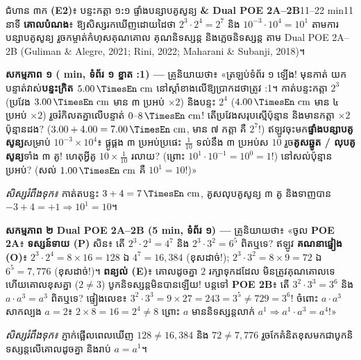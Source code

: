 \documentclass[a4paper,12pt]{article}
\newcommand{\en}[1]{{\TimesEn #1}}
\newcommand{\enbf}[1]{{\TimesEn\textbf{#1}}}
\newcommand{\unit}[1]{\,\text{\en{#1}}}
\newcommand{\scriptlead}{{\normalfont\mdseries\muol\fontsize{10.8pt}{17pt}\selectfont គ្រូនិយាយថា៖}}
\begin{document}
\Needspace{2.0cm}
\begin{phasebox}{ជំហាន ៣ក \enbf{(E2)}៖ បន្ទះកត្តា ១\enbf{:}១ ផ្ទាំងបន្សាបគូសូន្យ \enbf{\& Dual POE 2A--2B}}{11--22 min}{11 នាទី}
\textbf{គោលបំណង}៖ ឱ្យសិស្សរកឃើញដោយដៃថា $2^3\cdot 2^4 = 2^7$ និង $10^{-3}\cdot 10^4 = 10^1$ តាមការបន្សាបគូសូន្យ រួចកម្ចាត់កំហុសគុណគោល គុណនិទស្សន្ត និងភ្លេចនិទស្សន្ត \en{1} តាម \en{Dual POE 2A--2B} \en{(Guliman \& Alegre, 2021; Rini, 2022; Maharani \& Subanji, 2018)}។
\end{phasebox}
\begin{scriptbox}
  \textbf{សកម្មភាព ១ (\en{6 min}, ទំព័រ ១ ខ្នាត \en{1:1}) —} \scriptlead{} «ត្រឡប់ទំព័រ ១ ឡើង! មុនកាត់ យកបន្ទាត់វាស់\textbf{បន្ទះក្រិត $5.00\unit{cm}$} នៅស្ដាំខាងលើឱ្យប្រាកដថាត្រូវ \en{1:1}។ កាត់បន្ទះកត្តា $2^3$ (ប្រវែង $3.00\unit{cm}$ មាន ៣ ប្រអប់ $\times 2$) និងបន្ទះ $2^4$ ($4.00\unit{cm}$ មាន ៤ ប្រអប់ $\times 2$) រួចរំកិលតគ្នាលើបន្ទាត់ $0\text{--}8\unit{cm}$! តើប្រវែងសរុបស្មើប៉ុន្មាន និងមានកត្តា $\times 2$ ប៉ុន្មានដង? ($3.00 + 4.00 = 7.00\unit{cm}$, មាន ៧ កត្តា គឺ $2^7$!) ឥឡូវចុះមក\textbf{ផ្ទាំងបន្សាបគូសូន្យ}សម្រាប់ $10^{-3}\times 10^4$៖ ផ្គូផ្គង ៣ ប្រអប់ប្រផេះ $\frac{1}{10}$ \en{[-3]} ទល់នឹង ៣ ប្រអប់ស $10$ \en{[+4]} រួច\textbf{គូសឆ្នូត \en{/} លុបគូសូន្យ}ទាំង ៣ គូ! ហេតុអ្វីគូ $10 \times \frac{1}{10}$ រលាយ? (ព្រោះ $10^1\cdot 10^{-1} = 10^0 = 1$!) នៅសល់ប៉ុន្មានប្រអប់? (សល់ $1.00\unit{cm}$ គឺ $10^1 = 10$!)»\par
  \textit{សិស្សរំពឹងទុក៖} កាត់តបន្ទះ $3+4=7\unit{cm}$, គូសលុបគូសូន្យ ៣ គូ និងទាញបាន $-3+4 = +1 \Rightarrow 10^1=10$។\par\vspace{3pt}
  \textbf{សកម្មភាព ២ \en{Dual POE 2A--2B (5 min}, ទំព័រ ១) —} \scriptlead{} «ចូល \textbf{\en{POE 2A}}៖ \textbf{ទស្សន៍ទាយ (\en{P})} សិន៖ តើ $2^3\cdot 2^4 = 4^7$ និង $2^3\cdot 3^2 = 6^5$ ពិតឬទេ? ឥឡូវ \textbf{គណនាផ្ទៀង (\en{O})}៖ $2^3\cdot 2^4 = 8\times 16 = 128$ ឯ $4^7 = 16,384$ (ខុសដាច់!); $2^3\cdot 3^2 = 8\times 9 = 72$ ឯ $6^5 = 7,776$ (ខុសដាច់!)។ \textbf{ពន្យល់ (\en{E})}៖ គោលដូចគ្នា $2$ រក្សាទុកដដែល មិនត្រូវគុណគោលទេ ហើយគោលខុសគ្នា ($2 \neq 3$) បូកនិទស្សន្តមិនបានឡើយ! បន្តទៅ \textbf{\en{POE 2B}}៖ តើ $3^2\cdot 3^3 = 3^6$ និង $a\cdot a^3 = a^3$ ពិតឬទេ? ផ្ទៀងលេខ៖ $3^2\cdot 3^3 = 9\times 27 = 243 = 3^5 \neq 729 = 3^6$! ចំពោះ $a\cdot a^3$ សាកល្បង $a=2$៖ $2\times 8 = 16 = 2^4 \neq 8$ ព្រោះ $a$ មាននិទស្សន្តលាក់ $a^1 \Rightarrow a^1\cdot a^3 = a^4$!»\par
  \textit{សិស្សរំពឹងទុក៖} ភ្ញាក់ផ្អើលពេលឃើញ $128 \neq 16,384$ និង $72 \neq 7,776$ រួចកែគំនិតខុសមកជាបូកនិទស្សន្តលើគោលដូចគ្នា និងរាប់ $a=a^1$។
\end{scriptbox}
\end{document}
